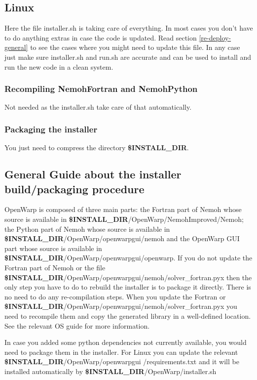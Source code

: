 \documentclass[12pt]{article}
\newcommand{\INSTALLDIR}{{\textbf{\$INSTALL{\_}DIR}}}
\begin{document}
\subsection{Linux}

Here the file installer.sh is taking care of everything. In most cases you don't have to do anything extras in case the code is updated. Read section \ref{re-deploy-general} to see the cases where you might need to update this file. In any case just make sure installer.sh and run.sh are accurate and can be used to install and run the new code in a clean system.

\subsubsection{Recompiling NemohFortran and NemohPython}
Not needed as the installer.sh take care of that automatically.
\subsubsection{Packaging the installer}
You just need to compress the directory \INSTALLDIR.

\subsection{General Guide about the installer build/packaging procedure}

OpenWarp is composed of three main parts: the Fortran part of Nemoh whose source is available in \INSTALLDIR/OpenWarp/NemohImproved/Nemoh; the Python part of Nemoh whose source is available in \INSTALLDIR/OpenWarp/openwarpgui/nemoh and the OpenWarp GUI part whose source is available in \INSTALLDIR/OpenWarp/openwarpgui/openwarp.
If you do not update the Fortran part of Nemoh or the file \INSTALLDIR/OpenWarp/openwarpgui/nemoh/solver_fortran.pyx then the only step you have to do to rebuild the installer is to package it directly. There is no need to do any re-compilation steps.
When you update the Fortran or \INSTALLDIR/OpenWarp/openwarpgui/nemoh/solver_fortran.pyx you need to recompile them and copy the generated library in a well-defined location. See the relevant OS guide for more information.


In case you added some python dependencies not currently available, you would need to package them in the installer. For Linux you can update the relevant \INSTALLDIR/OpenWarp/openwarpgui /requirements.txt and it will be installed automatically by \INSTALLDIR/OpenWarp/installer.sh
\end{document}
